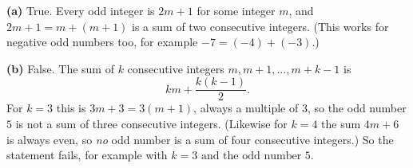 \textbf{(a)} True. Every odd integer is $2m+1$ for some integer $m$, and $2m+1=m+(m+1)$ is a sum of two consecutive integers. (This works for negative odd numbers too, for example $-7=(-4)+(-3)$.)

\textbf{(b)} False. The sum of $k$ consecutive integers $m,m+1,\dots,m+k-1$ is
\[km+\dfrac{k(k-1)}{2}.\]
For $k=3$ this is $3m+3=3(m+1)$, always a multiple of $3$, so the odd number $5$ is not a sum of three consecutive integers. (Likewise for $k=4$ the sum $4m+6$ is always even, so \emph{no} odd number is a sum of four consecutive integers.) So the statement fails, for example with $\boxed{k=3\text{ and the odd number }5}$.
